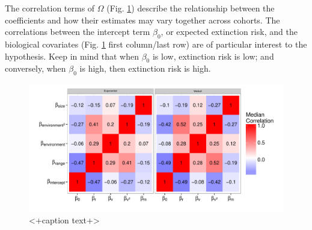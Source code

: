 \documentclass[12pt,letterpaper]{article}
\begin{document}
The correlation terms of \(\Omega\) (Fig. \ref{fig:omega}) describe the relationship between the coefficients and how their estimates may vary together across cohorts. The correlations between the intercept term \(\beta_{0}\), or expected extinction risk, and the biological covariates (Fig. \ref{fig:omega} first column/last row) are of particular interest to the \citet{Jablonski1986} hypothesis. Keep in mind that when \(\beta_{0}\) is low, extinction risk is low; and conversely, when \(\beta_{0}\) is high, then extinction risk is high.
\begin{figure}[ht]
  \centering
  \includegraphics[height = 0.5\textheight,width=\textwidth,keepaspectratio=true]{figure/correlation_heatmap}
  \caption{<+caption text+>}
  \label{fig:omega}
\end{figure}
\end{document}
